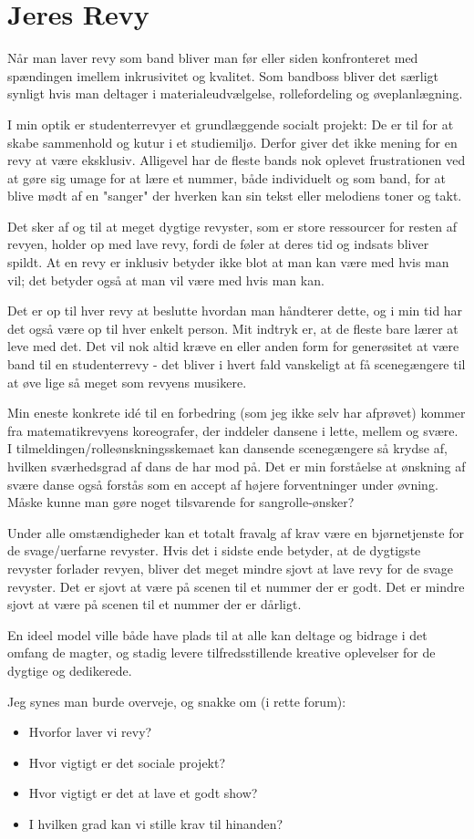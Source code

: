 \section{Jeres Revy}
Når man laver revy som band bliver man før eller siden konfronteret med spændingen imellem inkrusivitet og kvalitet. Som bandboss bliver det særligt synligt hvis man deltager i materialeudvælgelse, rollefordeling og øveplanlægning.

I min optik er studenterrevyer et grundlæggende socialt projekt: De er til for at skabe sammenhold og kutur i et studiemiljø.
Derfor giver det ikke mening for en revy at være eksklusiv.
Alligevel har de fleste bands nok oplevet frustrationen ved at gøre sig umage for at lære et nummer, både individuelt og som band, for at blive mødt af en "sanger" der hverken kan sin tekst eller melodiens toner og takt.

Det sker af og til at meget dygtige revyster, som er store ressourcer for resten af revyen, holder op med lave revy, fordi de føler at deres tid og indsats bliver spildt.
At en revy er inklusiv betyder ikke blot at man kan være med hvis man vil; det betyder også at man vil være med hvis man kan.

Det er op til hver revy at beslutte hvordan man håndterer dette, og i min tid har det også være op til hver enkelt person.
Mit indtryk er, at de fleste bare lærer at leve med det.
Det vil nok altid kræve en eller anden form for generøsitet at være band til en studenterrevy - det bliver i hvert fald vanskeligt at få scenegængere til at øve lige så meget som revyens musikere.

Min eneste konkrete idé til en forbedring (som jeg ikke selv har afprøvet) kommer fra matematikrevyens koreografer, der inddeler dansene i lette, mellem og svære.
I tilmeldingen/rolleønskningsskemaet kan dansende scenegængere så krydse af, hvilken sværhedsgrad af dans de har mod på.
Det er min forståelse at ønskning af svære danse også forstås som en accept af højere forventninger under øvning.
Måske kunne man gøre noget tilsvarende for sangrolle-ønsker?

Under alle omstændigheder kan et totalt fravalg af krav være en bjørnetjenste for de svage/uerfarne revyster.
Hvis det i sidste ende betyder, at de dygtigste revyster forlader revyen, bliver det meget mindre sjovt at lave revy for de svage revyster.
Det er sjovt at være på scenen til et nummer der er godt.
Det er mindre sjovt at være på scenen til et nummer der er dårligt.

En ideel model ville både have plads til at alle kan deltage og bidrage i det omfang de magter, og stadig levere tilfredsstillende kreative oplevelser for de dygtige og dedikerede.

Jeg synes man burde overveje, og snakke om (i rette forum):
\begin{itemize}
    \item Hvorfor laver vi revy?
    \item Hvor vigtigt er det sociale projekt?
    \item Hvor vigtigt er det at lave et godt show?
    \item I hvilken grad kan vi stille krav til hinanden?
\end{itemize}